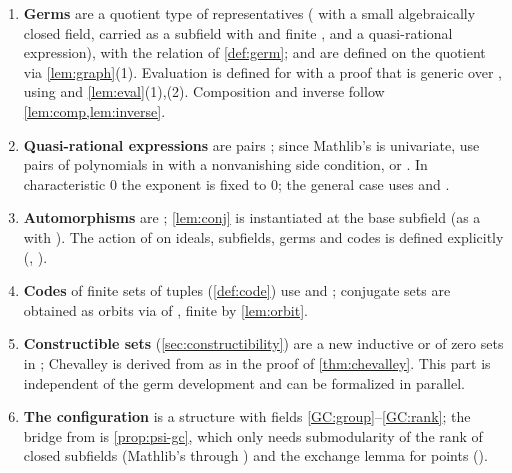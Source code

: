 \begin{enumerate}
  linear algebra plus  for field extensions.
\item \textbf{Germs} are a quotient type of representatives
  ( with a small algebraically closed field, carried as a
  subfield  with  and finite
  , and a quasi-rational expression), with the relation of
  \cref{def:germ};  and
   are defined on the quotient via
  \cref{lem:graph}(1).  Evaluation  is defined for  with a proof
  that  is generic over , using  and
  \cref{lem:eval}(1),(2).  Composition and inverse follow \cref{lem:comp,lem:inverse}.
\item \textbf{Quasi-rational expressions} are pairs ; since
  Mathlib's  is univariate, use pairs of polynomials in
   with a nonvanishing side condition, or
  .  In characteristic $0$ the exponent is
  fixed to $0$; the general case uses  and .
\item \textbf{Automorphisms} are ; \cref{lem:conj} is
   instantiated at the base
  subfield  (as a  with ).  The action of
   on ideals, subfields, germs and codes is defined explicitly
  (, ).
\item \textbf{Codes} of finite sets of tuples (\cref{def:code}) use
   and ; conjugate sets are
   obtained as orbits via  of
  , finite by \cref{lem:orbit}.
\item \textbf{Constructible sets} (\cref{sec:constructibility}) are a new inductive or
   of zero sets in ; Chevalley is
  derived from  as in the proof of
  \cref{thm:chevalley}.  This part is independent of the germ development and can be
  formalized in parallel.
\item \textbf{The configuration} is a structure 
  with fields \ref{GC:group}--\ref{GC:rank}; the bridge from 
  is \cref{prop:psi-gc}, which only needs submodularity of the rank of closed
  subfields (Mathlib's  through
  ) and the exchange lemma for points
   ().
\end{enumerate}

